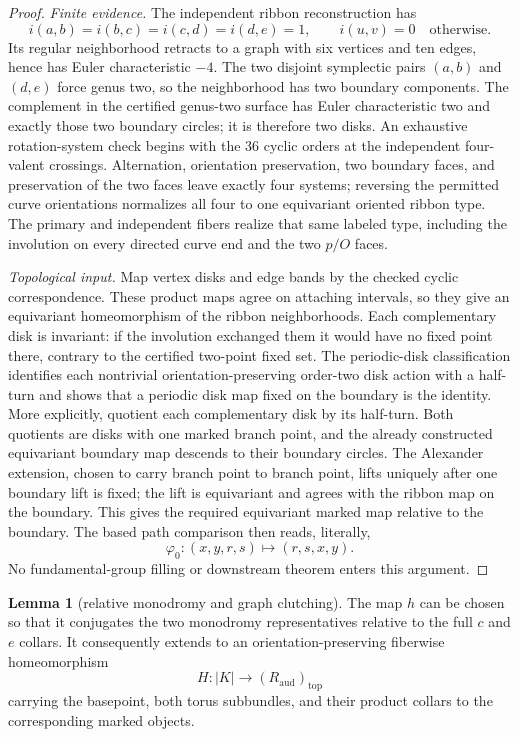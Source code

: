 \documentclass[11pt]{article}
\theoremstyle{definition}
\newtheorem{lemma}[theorem]{Lemma}
\begin{document}
\begin{proof}
\emph{Finite evidence.}  The independent ribbon reconstruction has
\[
 i(a,b)=i(b,c)=i(c,d)=i(d,e)=1,
 \qquad i(u,v)=0\quad\text{otherwise}.
\]
Its regular neighborhood retracts to a graph with six vertices and ten
edges, hence has Euler characteristic $-4$.  The two disjoint symplectic
pairs $(a,b)$ and $(d,e)$ force genus two, so the neighborhood has two
boundary components.  The complement in the certified genus-two surface
has Euler characteristic two and exactly those two boundary circles; it is
therefore two disks.  An exhaustive rotation-system check begins with the
$36$ cyclic orders at the independent four-valent crossings.  Alternation,
orientation preservation, two boundary faces, and preservation of the two
faces leave exactly four systems; reversing the permitted curve
orientations normalizes all four to one equivariant oriented ribbon type.
The primary and independent fibers realize that same labeled type, including
the involution on every directed curve end and the two $p/O$ faces.

\emph{Topological input.}  Map vertex disks and edge bands by the checked
cyclic correspondence.  These product maps agree on attaching intervals,
so they give an equivariant homeomorphism of the ribbon neighborhoods.
Each complementary disk is invariant: if the involution exchanged them it
would have no fixed point there, contrary to the certified two-point fixed
set.  The periodic-disk classification
\cite[Theorem~3.1 and Proposition~3.2]{ConstantinKolev} identifies each
nontrivial orientation-preserving order-two disk action with a half-turn and
shows that a periodic disk map fixed on the boundary is the identity.  More
explicitly, quotient each complementary disk by its half-turn.  Both
quotients are disks with one marked branch point, and the already constructed
equivariant boundary map descends to their boundary circles.  The Alexander
extension, chosen to carry branch point to branch point, lifts uniquely after
one boundary lift is fixed; the lift is equivariant and agrees with the ribbon
map on the boundary.  This gives the required equivariant marked map relative
to the boundary.  The based path comparison
then reads, literally,
\[
 \varphi_0:(x,y,r,s)\longmapsto(r,s,x,y).
\]
No fundamental-group filling or downstream theorem enters this argument.
\end{proof}

\begin{lemma}[relative monodromy and graph clutching]\label{lem:clutching}
The map $h$ can be chosen so that it conjugates the two monodromy
representatives relative to the full $c$ and $e$ collars.  It consequently
extends to an orientation-preserving fiberwise homeomorphism
\[
 H:|K|\longrightarrow (R_{\mathrm{aud}})_{\mathrm{top}}
\]
carrying the basepoint, both torus subbundles, and their product collars to
the corresponding marked objects.
\end{lemma}
\end{document}
